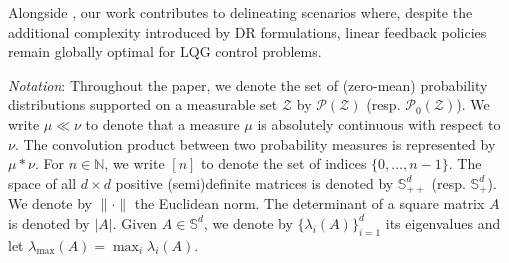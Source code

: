 \documentclass[letterpaper, 10 pt, conference]{ieeeconf}  %
\theoremstyle{ieeeconf}
\newcommand{\Symm}{\mathbb{S}}
\begin{document}
Alongside \cite{taskesen2023distributionally, lanzetti2024optimality, fochesato2025distributionally, falconi2025distributionally}, our work contributes to delineating scenarios where, despite the additional complexity introduced by DR formulations, linear feedback policies remain globally optimal for LQG control problems.

\textit{Notation}: Throughout the paper, we denote the set of (zero-mean) probability distributions supported on a measurable set $\mathcal{Z}$ by $\mathcal{P}(\mathcal{Z})$ (resp. $\mathcal{P}_0(\mathcal{Z})$). We write $\mu \ll \nu$ to denote that a measure $\mu$ is absolutely continuous with respect to $\nu$. The convolution product between two probability measures is represented by $\mu*\nu$. For $n \in \mathbb{N}$, we write $[n]$ to denote the set of indices $\{0,\dots, n-1\}$. The space of all $d\times d$ positive (semi)definite matrices is denoted by \( \mathbb{S}_{++}^d \) (resp. \( \mathbb{S}^d_+ \)). We denote by $\|\cdot\|$ the Euclidean norm. The determinant of a square matrix $A$ is denoted by $|A|$. Given $A \in \Symm^{d}$, we denote by $\{\lambda_i(A)\}_{i = 1}^d$ its eigenvalues and let $\lambda_{\text{max}}(A) = \max_i \lambda_i(A)$.%










\end{document}
